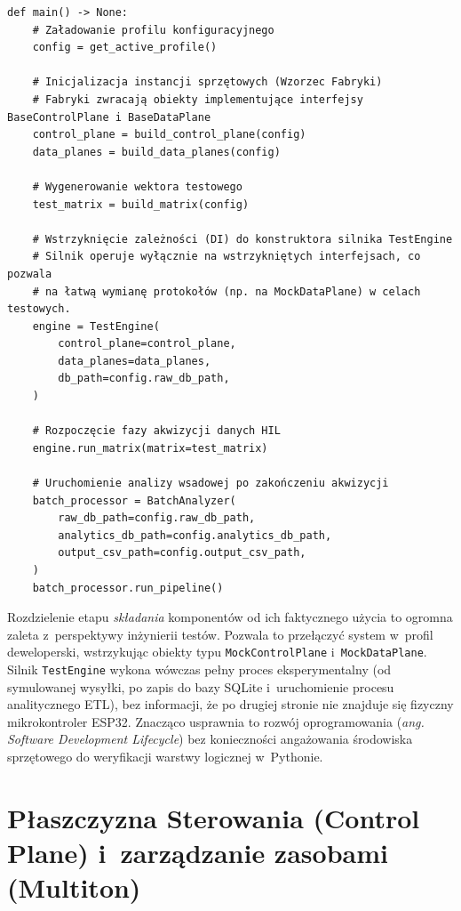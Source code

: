 \begin{listing}[htbp]
    \caption{Wykorzystanie wzorca Fabryki i~Wstrzykiwania Zależności do izolacji logiki wykonawczej od warstwy sprzętowej (\texttt{main.py}) \cite{espy_nexus_python_host}.}
    \label{lst:python_di_main}
    \begin{verbatim}
def main() -> None:
    # Załadowanie profilu konfiguracyjnego
    config = get_active_profile()

    # Inicjalizacja instancji sprzętowych (Wzorzec Fabryki)
    # Fabryki zwracają obiekty implementujące interfejsy BaseControlPlane i BaseDataPlane
    control_plane = build_control_plane(config)
    data_planes = build_data_planes(config)

    # Wygenerowanie wektora testowego
    test_matrix = build_matrix(config)

    # Wstrzyknięcie zależności (DI) do konstruktora silnika TestEngine
    # Silnik operuje wyłącznie na wstrzykniętych interfejsach, co pozwala 
    # na łatwą wymianę protokołów (np. na MockDataPlane) w celach testowych.
    engine = TestEngine(
        control_plane=control_plane,
        data_planes=data_planes,
        db_path=config.raw_db_path,
    )
    
    # Rozpoczęcie fazy akwizycji danych HIL
    engine.run_matrix(matrix=test_matrix)

    # Uruchomienie analizy wsadowej po zakończeniu akwizycji
    batch_processor = BatchAnalyzer(
        raw_db_path=config.raw_db_path,
        analytics_db_path=config.analytics_db_path,
        output_csv_path=config.output_csv_path,
    )
    batch_processor.run_pipeline()
\end{verbatim}
\end{listing}

Rozdzielenie etapu \textit{składania} komponentów od ich faktycznego użycia to ogromna zaleta z~perspektywy inżynierii testów.
Pozwala to przełączyć system w~profil deweloperski, wstrzykując obiekty typu \texttt{MockControlPlane} i~\texttt{MockDataPlane}.
Silnik \texttt{TestEngine} wykona wówczas pełny proces eksperymentalny (od symulowanej wysyłki, po zapis do bazy SQLite i~uruchomienie procesu analitycznego ETL), bez informacji, że po drugiej stronie nie znajduje się fizyczny mikrokontroler ESP32.
Znacząco usprawnia to rozwój oprogramowania (\textit{ang. Software Development Lifecycle}) bez konieczności angażowania środowiska sprzętowego do weryfikacji warstwy logicznej w~Pythonie.

\section{Płaszczyzna Sterowania (Control Plane) i~zarządzanie zasobami (Multiton)}
\label{sec:control_plane_multiton}

